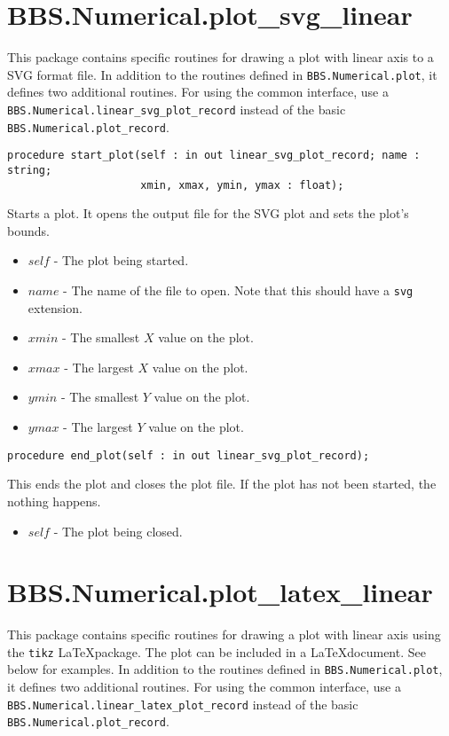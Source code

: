 \documentclass[10pt, openany]{book}
\newcommand{\package}[1]{\texttt{#1}}
\newcommand{\datatype}[1]{\texttt{#1}}
\newcommand{\cli}[1]{\texttt{#1}}
\begin{document}
\section{BBS.Numerical.plot\_svg\_linear}
This package contains specific routines for drawing a plot with linear axis to a SVG format file.  In addition to the routines defined in \package{BBS.Numerical.plot}, it defines two additional routines.  For using the common interface, use a \datatype{BBS.Numerical.linear\_svg\_plot\_record} instead of the basic \datatype{BBS.Numerical.plot\_record}.
\begin{lstlisting}
procedure start_plot(self : in out linear_svg_plot_record; name : string;
                     xmin, xmax, ymin, ymax : float);
\end{lstlisting}
Starts a plot.  It opens the output file for the SVG plot and sets the plot's bounds.
\begin{itemize}
  \item $self$ - The plot being started.
  \item $name$ - The name of the file to open.  Note that this should have a \cli{svg} extension.
  \item $xmin$ - The smallest $X$ value on the plot.
  \item $xmax$ - The largest $X$ value on the plot.
  \item $ymin$ - The smallest $Y$ value on the plot.
  \item $ymax$ - The largest $Y$ value on the plot.
\end{itemize}
\begin{lstlisting}
procedure end_plot(self : in out linear_svg_plot_record);
\end{lstlisting}
This ends the plot and closes the plot file.  If the plot has not been started, the nothing happens.
\begin{itemize}
  \item $self$ - The plot being closed.
\end{itemize}

\section{BBS.Numerical.plot\_latex\_linear}
This package contains specific routines for drawing a plot with linear axis using the \package{tikz} \LaTeX package.  The plot can be included in a \LaTeX document.  See below for examples.  In addition to the routines defined in \package{BBS.Numerical.plot}, it defines two additional routines.  For using the common interface, use a \datatype{BBS.Numerical.linear\_latex\_plot\_record} instead of the basic \datatype{BBS.Numerical.plot\_record}.
\end{document}
